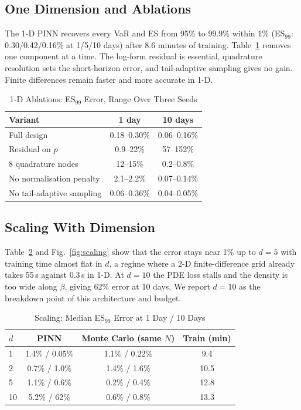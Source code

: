 \documentclass[conference]{IEEEtran}
\begin{document}
\subsection{One Dimension and Ablations}
The 1-D PINN recovers every VaR and ES from 95\% to 99.9\% within 1\% (ES$_{99}$: 0.30/0.42/0.16\% at 1/5/10 days)
after 8.6 minutes of training. Table~\ref{tab:ablation} removes one component at a time. The log-form residual is
essential, quadrature resolution sets the short-horizon error, and tail-adaptive sampling gives no gain. Finite
differences remain faster and more accurate in 1-D.

\begin{table}[!t]
  \caption{1-D Ablations: ES$_{99}$ Error, Range Over Three Seeds}
  \label{tab:ablation}
  \centering
  \begin{tabular}{lcc}
    \toprule
    Variant & 1 day & 10 days \\
    \midrule
    Full design                 & 0.18--0.30\% & 0.06--0.16\% \\
    Residual on $p$             & 0.9--22\%    & 57--152\% \\
    8 quadrature nodes          & 12--15\%     & 0.2--0.8\% \\
    No normalisation penalty    & 2.1--2.2\%   & 0.07--0.14\% \\
    No tail-adaptive sampling   & 0.06--0.36\% & 0.04--0.05\% \\
    \bottomrule
  \end{tabular}
\end{table}

\subsection{Scaling With Dimension}
Table~\ref{tab:scaling} and Fig.~\ref{fig:scaling} show that the error stays near 1\% up to $d = 5$ with training
time almost flat in $d$, a regime where a 2-D finite-difference grid already takes 55\,s against 0.3\,s in 1-D.
At $d = 10$ the PDE loss stalls and the density is too wide along $\beta$, giving 62\% error at 10 days. We report
$d = 10$ as the breakdown point of this architecture and budget.

\begin{table}[!t]
  \caption{Scaling: Median ES$_{99}$ Error at 1 Day / 10 Days}
  \label{tab:scaling}
  \centering
  \begin{tabular}{lccc}
    \toprule
    $d$ & PINN & Monte Carlo (same $N$) & Train (min) \\
    \midrule
    1  & 1.4\% / 0.05\% & 1.1\% / 0.22\% & 9.4 \\
    2  & 0.7\% / 1.0\%  & 1.4\% / 1.6\%  & 10.5 \\
    5  & 1.1\% / 0.6\%  & 0.2\% / 0.4\%  & 12.8 \\
    10 & 5.2\% / 62\%   & 0.6\% / 0.8\%  & 13.3 \\
    \bottomrule
  \end{tabular}
\end{table}
\end{document}

